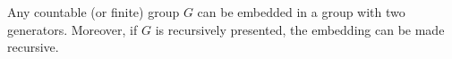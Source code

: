 Any countable (or finite) group $G$ can be embedded in a group with two generators. Moreover, if $G$ is recursively presented, the embedding can be made recursive.
